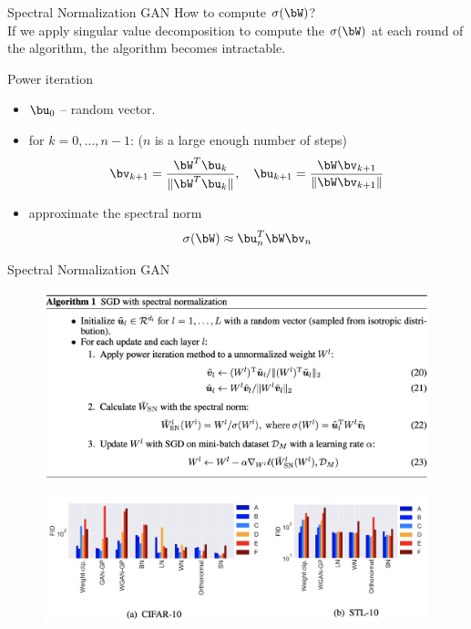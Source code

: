 \begin{frame}{Spectral Normalization GAN}
	How to compute $\sigma(\bW)$? \\
	 If we apply singular value decomposition to compute the $\sigma(\bW)$ at each round of the algorithm, the algorithm becomes intractable.
	 \begin{block}{Power iteration}
	 	\begin{itemize}
	 		\item $\bu_0$ -- random vector.
	 		\item for $k = 0, \dots, n - 1$: ($n$ is a large enough number of steps)
	 		\[
	 			\bv_{k+1} = \frac{\bW^T \bu_{k}}{\| \bW^T \bu_{k} \|}, \quad \bu_{k+1} = \frac{\bW \bv_{k+1}}{\| \bW \bv_{k+1} \|}
	 		\]
	 		\item approximate the spectral norm
	 		\[
	 			\sigma(\bW) \approx \bu_{n}^T \bW \bv_{n}
	 		\]
	 	\end{itemize}
	 \end{block}

\end{frame}
\begin{frame}{Spectral Normalization GAN}
	\begin{figure}
		\centering
		\includegraphics[width=0.85\linewidth]{figs/sngan_pseudocode}
	\end{figure}
	\begin{figure}
		\centering
		\includegraphics[width=0.85\linewidth]{figs/sngan_fids}
	\end{figure}

\end{frame}

